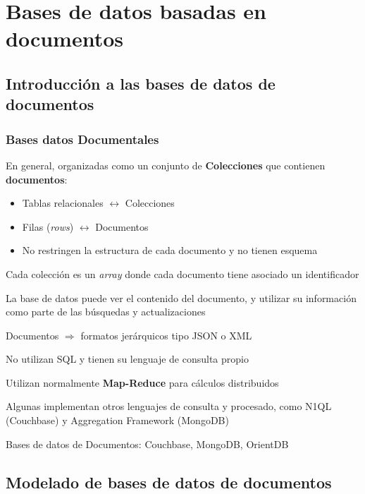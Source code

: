 \section{Bases de datos basadas en documentos}
\subsection{Introducción a las bases de datos de documentos}
\subsubsection{Bases datos Documentales}
En general, organizadas como un conjunto de \textbf{Colecciones} que contienen \textbf{documentos}:
\begin{itemize}
\item Tablas relacionales $\leftrightarrow$ Colecciones
\item Filas (\textit{rows}) $\leftrightarrow$ Documentos
\item No restringen la estructura de cada documento y no tienen esquema
\end{itemize}
Cada colección es un \textit{array} donde cada documento tiene asociado un identificador

La base de datos puede ver el contenido del documento, y utilizar su información como parte de las búsquedas y actualizaciones

Documentos $\Rightarrow$ formatos jerárquicos tipo JSON o XML

No utilizan SQL y tienen su lenguaje de consulta propio

Utilizan normalmente \textbf{Map-Reduce} para cálculos distribuidos

Algunas implementan otros lenguajes de consulta y procesado, como N1QL (Couchbase) y Aggregation Framework (MongoDB)

Bases de datos de Documentos: Couchbase, MongoDB, OrientDB
\subsection{Modelado de bases de datos de documentos}
